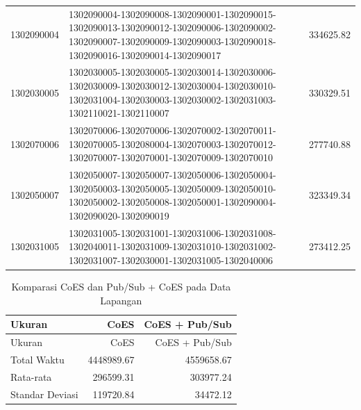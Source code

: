 \begin{longtable}[!]{lp{8cm}r}
		1302090004 & 1302090004-1302090008-1302090001-1302090015-1302090013-1302090012-1302090006-1302090002-1302090007-1302090009-1302090003-1302090018-1302090016-1302090014-1302090017 & 334625.82 \\
		1302030005 & 1302030005-1302030005-1302030014-1302030006-1302030009-1302030012-1302030004-1302030010-1302031004-1302030003-1302030002-1302031003-1302110021-1302110007 & 330329.51 \\
		1302070006 & 1302070006-1302070006-1302070002-1302070011-1302070005-1302080004-1302070003-1302070012-1302070007-1302070001-1302070009-1302070010 & 277740.88 \\
		1302050007 & 1302050007-1302050007-1302050006-1302050004-1302050003-1302050005-1302050009-1302050010-1302050002-1302050008-1302050001-1302090004-1302090020-1302090019 & 323349.34 \\
		1302031005 & 1302031005-1302031001-1302031006-1302031008-1302040011-1302031009-1302031010-1302031002-1302031007-1302030001-1302031005-1302040006 & 273412.25 \\
\end{longtable}


\begin{longtable}[!]{lrr}
	\caption{Komparasi CoES dan Pub/Sub + CoES pada Data Lapangan}
	\label{tbl:test_result_normal_field_comparison}\\
	\toprule
		Ukuran & CoES & CoES + Pub/Sub\\ 
	\midrule
	\endfirsthead
	\toprule
		Ukuran & CoES & CoES + Pub/Sub\\ 
	\midrule
	\endhead
	\bottomrule
	\endfoot
		Total Waktu & 4448989.67 & 4559658.67\\
		Rata-rata & 296599.31 & 303977.24\\
		Standar Deviasi & 119720.84 & 34472.12\\
\end{longtable}


